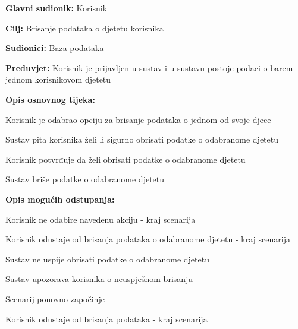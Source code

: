					\noindent {}
					\begin{packed_item}
	
						\item \textbf{Glavni sudionik: }Korisnik
						\item  \textbf{Cilj:} Brisanje podataka o djetetu korisnika
						\item  \textbf{Sudionici:} Baza podataka
						\item  \textbf{Preduvjet:} Korisnik je prijavljen u sustav i u sustavu postoje podaci o barem jednom korisnikovom djetetu

						\item  \textbf{Opis osnovnog tijeka:}
						
						\item[] \begin{packed_enum}
							\item Korisnik je odabrao opciju za brisanje podataka o jednom od svoje djece
							\item Sustav pita korisnika želi li sigurno obrisati podatke o odabranome djetetu
							\item Korisnik potvrđuje da želi obrisati podatke o odabranome djetetu
							\item Sustav briše podatke o odabranome djetetu
						\end{packed_enum}

						\item  \textbf{Opis mogućih odstupanja:}

						\item[] \begin{packed_item}
							\item[1.a] Korisnik ne odabire navedenu akciju - kraj scenarija
							\item[3.a] Korisnik odustaje od brisanja podataka o odabranome djetetu - kraj scenarija
							\item[4.a] Sustav ne uspije obrisati podatke o odabranome djetetu
							\item[] \begin{packed_enum}
								\item Sustav upozorava korisnika o neuspješnom brisanju
								\item
									\begin{packed_enum}
										\item Scenarij ponovno započinje
										\item Korisnik odustaje od brisanja podataka - kraj scenarija
									\end{packed_enum}	
							\end{packed_enum}					
						\end{packed_item}
					\end{packed_item}	

